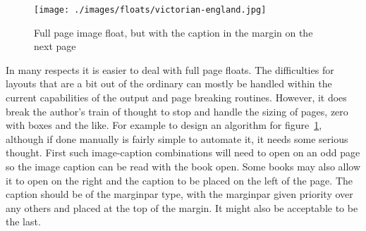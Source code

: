 \begin{figure}[hbt]
\texttt{[image: ./images/floats/victorian-england.jpg]}
\caption{Full page image float, but with the caption in the margin on the next page}
\label{fig:victorian}
\end{figure}

In many respects it is easier to deal with full page floats. The difficulties for layouts that are a bit out of the ordinary can mostly be handled within the current capabilities of the \latexe output and page breaking routines. However, it does break the author’s train of thought to stop and handle the sizing of pages, zero with boxes and the like. For example to design an algorithm for figure~\ref{fig:victorian}, although if done manually is fairly simple to automate it, it needs some serious thought. First such image-caption combinations will need to open on an odd page so the image caption can be read with the book open. Some books may also allow it to open on the right and the caption to be placed on the left of the page. The caption should be of the
marginpar type, with the marginpar given priority over any others and placed at the top of the margin. It might also be acceptable to be the last.

